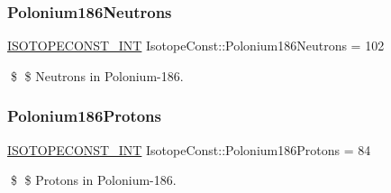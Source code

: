 \subsubsection{\texorpdfstring{Polonium186\+Neutrons}{Polonium186Neutrons}}
{\footnotesize\ttfamily \mbox{\hyperlink{group___isotope_const-_macros_ga5f18360b3e99483a35c32d789e62621c}{I\+S\+O\+T\+O\+P\+E\+C\+O\+N\+S\+T\+\_\+\+I\+NT}} Isotope\+Const\+::\+Polonium186\+Neutrons = 102}

\$ \$ Neutrons in Polonium-\/186. \mbox{\label{group___isotope_const-_polonium-_po186_ga34280317a3c65e1200108d5626d023ca}} 
\subsubsection{\texorpdfstring{Polonium186\+Protons}{Polonium186Protons}}
{\footnotesize\ttfamily \mbox{\hyperlink{group___isotope_const-_macros_ga5f18360b3e99483a35c32d789e62621c}{I\+S\+O\+T\+O\+P\+E\+C\+O\+N\+S\+T\+\_\+\+I\+NT}} Isotope\+Const\+::\+Polonium186\+Protons = 84}

\$ \$ Protons in Polonium-\/186. 